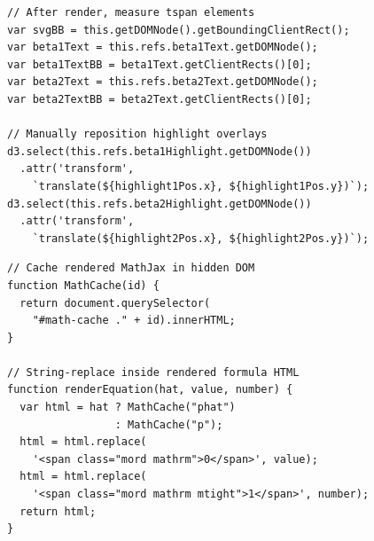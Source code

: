 \begin{minipage}{\textwidth}
\centering
\begin{minipage}[t]{0.48\textwidth}
\begin{lstlisting}[basicstyle=\ttfamily\scriptsize, frame=single, title={OLS Regression: DOM geometry for highlight positioning}]
// After render, measure tspan elements
var svgBB = this.getDOMNode().getBoundingClientRect();
var beta1Text = this.refs.beta1Text.getDOMNode();
var beta1TextBB = beta1Text.getClientRects()[0];
var beta2Text = this.refs.beta2Text.getDOMNode();
var beta2TextBB = beta2Text.getClientRects()[0];

// Manually reposition highlight overlays
d3.select(this.refs.beta1Highlight.getDOMNode())
  .attr('transform',
    `translate(${highlight1Pos.x}, ${highlight1Pos.y})`);
d3.select(this.refs.beta2Highlight.getDOMNode())
  .attr('transform',
    `translate(${highlight2Pos.x}, ${highlight2Pos.y})`);
\end{lstlisting}
\end{minipage}
\hfill
\begin{minipage}[t]{0.48\textwidth}
\begin{lstlisting}[basicstyle=\ttfamily\scriptsize, frame=single, title={Why Momentum Really Works: HTML string replacement}]
// Cache rendered MathJax in hidden DOM
function MathCache(id) {
  return document.querySelector(
    "#math-cache ." + id).innerHTML;
}

// String-replace inside rendered formula HTML
function renderEquation(hat, value, number) {
  var html = hat ? MathCache("phat")
                 : MathCache("p");
  html = html.replace(
    '<span class="mord mathrm">0</span>', value);
  html = html.replace(
    '<span class="mord mathrm mtight">1</span>', number);
  return html;
}
\end{lstlisting}
\end{minipage}
\label{fig:latex-dom-manipulation}
\end{minipage}

